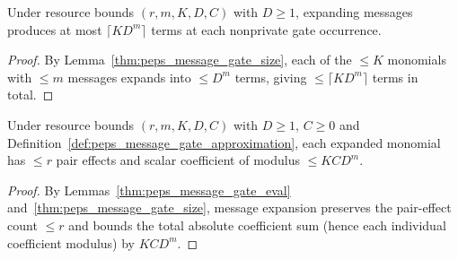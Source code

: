 \begin{lemma}
    \label{thm:peps_message_expand_monomial_count}
    \leanok
    Under resource bounds $(r,m,K,D,C)$ with $D\ge1$, expanding messages produces at most $\lceil KD^m\rceil$ terms at each nonprivate gate occurrence.
\end{lemma}
\begin{proof}
    \leanok
    By Lemma~\ref{thm:peps_message_gate_size}, each of the $\le K$ monomials with $\le m$ messages expands into $\le D^m$ terms, giving $\le\lceil KD^m\rceil$ terms in total.
\end{proof}

\begin{lemma}
    \label{thm:peps_message_expand_termwise_bound}
    \leanok
    Under resource bounds $(r,m,K,D,C)$ with $D\ge1$, $C\ge0$ and Definition~\ref{def:peps_message_gate_approximation}, each expanded monomial has $\le r$ pair effects and scalar coefficient of modulus $\le KCD^m$.
\end{lemma}
\begin{proof}
    \leanok
    By Lemmas~\ref{thm:peps_message_gate_eval} and~\ref{thm:peps_message_gate_size}, message expansion preserves the pair-effect count $\le r$ and bounds the total absolute coefficient sum (hence each individual coefficient modulus) by $KCD^m$.
\end{proof}


